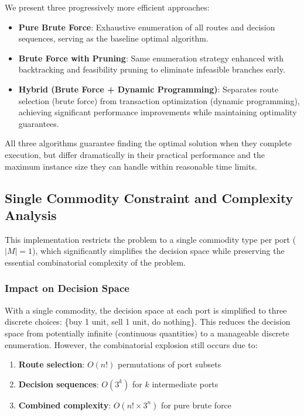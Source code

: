 \documentclass[12pt]{article}
\begin{document}
We present three progressively more efficient approaches:
\begin{itemize}
    \item \textbf{Pure Brute Force}: Exhaustive enumeration of all routes and decision sequences, serving as the baseline optimal algorithm.
    \item \textbf{Brute Force with Pruning}: Same enumeration strategy enhanced with backtracking and feasibility pruning to eliminate infeasible branches early.
    \item \textbf{Hybrid (Brute Force + Dynamic Programming)}: Separates route selection (brute force) from transaction optimization (dynamic programming), achieving significant performance improvements while maintaining optimality guarantees.
\end{itemize}

All three algorithms guarantee finding the optimal solution when they complete execution, but differ dramatically in their practical performance and the maximum instance size they can handle within reasonable time limits.

\subsection{Single Commodity Constraint and Complexity Analysis}
\label{subsec:single_commodity}

This implementation restricts the problem to a single commodity type per port ($|M| = 1$), which significantly simplifies the decision space while preserving the essential combinatorial complexity of the problem.

\subsubsection{Impact on Decision Space}

With a single commodity, the decision space at each port is simplified to three discrete choices: \{buy 1 unit, sell 1 unit, do nothing\}. This reduces the decision space from potentially infinite (continuous quantities) to a manageable discrete enumeration. However, the combinatorial explosion still occurs due to:

\begin{enumerate}
    \item \textbf{Route selection}: $O(n!)$ permutations of port subsets
    \item \textbf{Decision sequences}: $O(3^k)$ for $k$ intermediate ports
    \item \textbf{Combined complexity}: $O(n! \times 3^n)$ for pure brute force
\end{enumerate}
\end{document}
